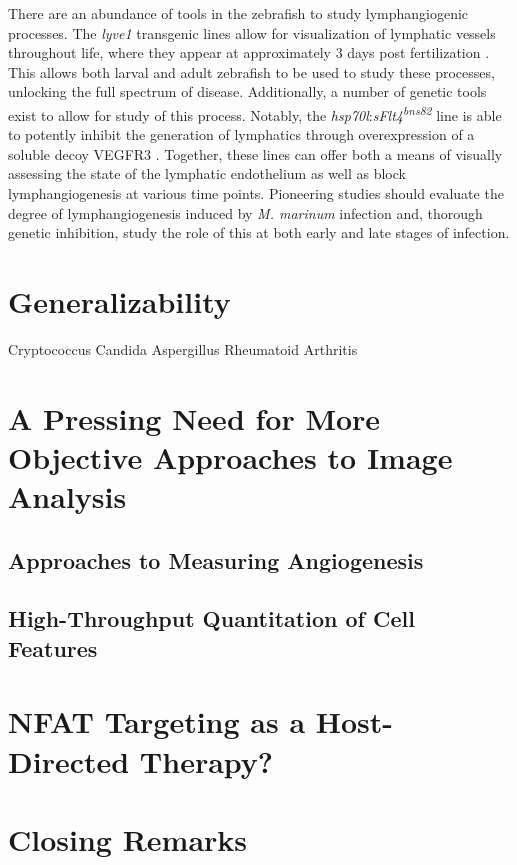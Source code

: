 There are an abundance of tools in the zebrafish to study lymphangiogenic processes. The \textit{lyve1} transgenic lines allow for visualization of lymphatic vessels throughout life, where they appear at approximately 3 days post fertilization \citep{Okuda2012}. This allows both larval and adult zebrafish to be used to study these processes, unlocking the full spectrum of disease. Additionally, a number of genetic tools exist to allow for study of this process. Notably, the \textit{hsp70l}:\textit{sFlt4\textsuperscript{bns82}} line is able to potently inhibit the generation of lymphatics through overexpression of a soluble decoy VEGFR3 \citep{Matsuoka2016}. Together, these lines can offer both a means of visually assessing the state of the lymphatic endothelium as well as block lymphangiogenesis at various time points. Pioneering studies should evaluate the degree of lymphangiogenesis induced by \textit{M. marinum} infection and, thorough genetic inhibition, study the role of this at both early and late stages of infection. 

\citep{Alitalo2005}
\citep{Bower2017a}
\citep{Bower2017b}
\citep{Bussmann2010}
\citep{Campuzano2017}
\citep{Dietrich2007}
\citep{Duong2012}
\citep{Hogan2009}
\citep{Wong2017b}
\citep{Makinen2001}
\citep{LeGuen2014}
\citep{Kuchler2006}
\citep{Haiko2008}
\citep{Stacker2014}
\citep{Nicenboim2015}
\citep{Onder2017}
\citep{Han2017}
\citep{Jung2017}
\citep{vanLessen2017}
\citep{Shin2017}
\citep{Okuda2015}
\citep{Weichand2017}
\citep{Yaniv2006}

\section{Generalizability}

Cryptococcus
Candida
Aspergillus
Rheumatoid Arthritis

\citep{Bojarczuk2016, Lin2006b, BenAmi2013, Elshabrawy2015, Kontoyiannis2010, MacDonald2018, Nacev2011, Osherov2016, Paleolog2002, Ristow2021, Saber2011}

\section{A Pressing Need for More Objective Approaches to Image Analysis}

\subsection{Approaches to Measuring Angiogenesis}
\subsection{High-Throughput Quantitation of Cell Features}
\citep{Heath2017}


\section{NFAT Targeting as a Host-Directed Therapy?}

\citep{Shen2022, Turgut2011}

\section{Closing Remarks}

